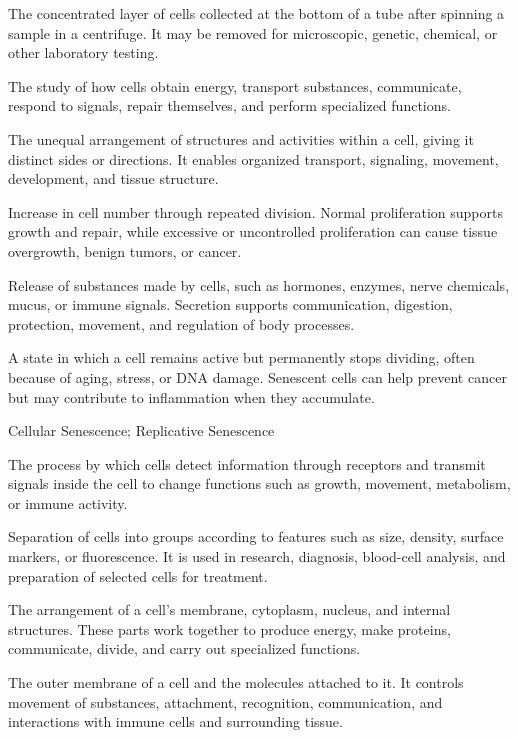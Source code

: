  The concentrated layer of cells collected at the bottom of a tube after spinning a sample in a centrifuge. It may be removed for microscopic, genetic, chemical, or other laboratory testing.

 The study of how cells obtain energy, transport substances, communicate, respond to signals, repair themselves, and perform specialized functions.

 The unequal arrangement of structures and activities within a cell, giving it distinct sides or directions. It enables organized transport, signaling, movement, development, and tissue structure.

 Increase in cell number through repeated division. Normal proliferation supports growth and repair, while excessive or uncontrolled proliferation can cause tissue overgrowth, benign tumors, or cancer.

 Release of substances made by cells, such as hormones, enzymes, nerve chemicals, mucus, or immune signals. Secretion supports communication, digestion, protection, movement, and regulation of body processes.

 A state in which a cell remains active but permanently stops dividing, often because of aging, stress, or DNA damage. Senescent cells can help prevent cancer but may contribute to inflammation when they accumulate.

\synonyms
Cellular Senescence; Replicative Senescence

 The process by which cells detect information through receptors and transmit signals inside the cell to change functions such as growth, movement, metabolism, or immune activity.

 Separation of cells into groups according to features such as size, density, surface markers, or fluorescence. It is used in research, diagnosis, blood-cell analysis, and preparation of selected cells for treatment.

 The arrangement of a cell's membrane, cytoplasm, nucleus, and internal structures. These parts work together to produce energy, make proteins, communicate, divide, and carry out specialized functions.

 The outer membrane of a cell and the molecules attached to it. It controls movement of substances, attachment, recognition, communication, and interactions with immune cells and surrounding tissue.

